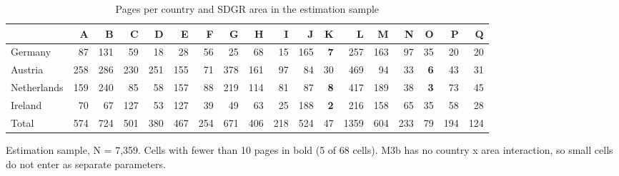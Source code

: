 \begin{table}[htbp]
\centering
\scriptsize\setlength{\tabcolsep}{3pt}
\begin{threeparttable}
\caption{Pages per country and SDGR area in the estimation sample}
\label{tab:cells-country-area}
\begin{tabular}{lrrrrrrrrrrrrrrrrr}
\hline
 & A & B & C & D & E & F & G & H & I & J & K & L & M & N & O & P & Q \\
\hline
Germany & 87 & 131 & 59 & 18 & 28 & 56 & 25 & 68 & 15 & 165 & \textbf{7} & 257 & 163 & 97 & 35 & 20 & 20 \\
Austria & 258 & 286 & 230 & 251 & 155 & 71 & 378 & 161 & 97 & 84 & 30 & 469 & 94 & 33 & \textbf{6} & 43 & 31 \\
Netherlands & 159 & 240 & 85 & 58 & 157 & 88 & 219 & 114 & 81 & 87 & \textbf{8} & 417 & 189 & 38 & \textbf{3} & 73 & 45 \\
Ireland & 70 & 67 & 127 & 53 & 127 & 39 & 49 & 63 & 25 & 188 & \textbf{2} & 216 & 158 & 65 & 35 & 58 & 28 \\
\hline
Total & 574 & 724 & 501 & 380 & 467 & 254 & 671 & 406 & 218 & 524 & 47 & 1359 & 604 & 233 & 79 & 194 & 124 \\
\hline
\end{tabular}
\begin{tablenotes}
\footnotesize
\item Estimation sample, N = 7,359. Cells with fewer than 10 pages in bold (5 of 68 cells). M3b has no country x area interaction, so small cells do not enter as separate parameters.
\end{tablenotes}
\end{threeparttable}
\end{table}
